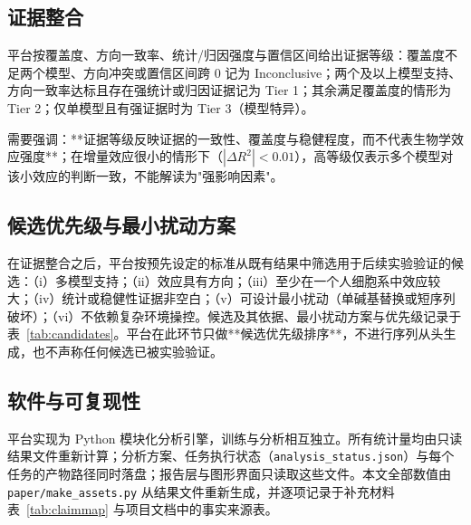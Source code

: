 \subsection{证据整合}

平台按覆盖度、方向一致率、统计/归因强度与置信区间给出证据等级：覆盖度不足两个模型、方向冲突或置信区间跨 0 记为 Inconclusive；两个及以上模型支持、方向一致率达标且存在强统计或归因证据记为 Tier 1；其余满足覆盖度的情形为 Tier 2；仅单模型且有强证据时为 Tier 3（模型特异）。

需要强调：**证据等级反映证据的一致性、覆盖度与稳健程度，而不代表生物学效应强度**；在增量效应很小的情形下（$|\Delta R^{2}|<0.01$），高等级仅表示多个模型对该小效应的判断一致，不能解读为"强影响因素"。

\subsection{候选优先级与最小扰动方案}

在证据整合之后，平台按预先设定的标准从既有结果中筛选用于后续实验验证的候选：（i）多模型支持；（ii）效应具有方向；（iii）至少在一个人细胞系中效应较大；（iv）统计或稳健性证据非空白；（v）可设计最小扰动（单碱基替换或短序列破坏）；（vi）不依赖复杂环境操控。候选及其依据、最小扰动方案与优先级记录于表~\ref{tab:candidates}。平台在此环节只做**候选优先级排序**，不进行序列从头生成，也不声称任何候选已被实验验证。

\subsection{软件与可复现性}

平台实现为 Python 模块化分析引擎，训练与分析相互独立。所有统计量均由只读结果文件重新计算；分析方案、任务执行状态（\texttt{analysis\_status.json}）与每个任务的产物路径同时落盘；报告层与图形界面只读取这些文件。本文全部数值由 \texttt{paper/make\_assets.py} 从结果文件重新生成，并逐项记录于补充材料表~\ref{tab:claimmap} 与项目文档中的事实来源表。
